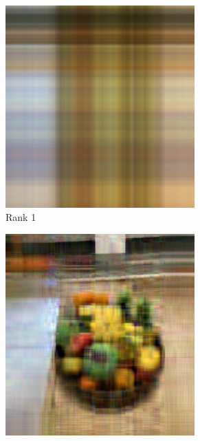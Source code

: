 \documentclass[12pt]{article}
\theoremstyle{definition}
\begin{document}
\begin{figure}[ht]
     \centering
     \begin{subfigure}[b]{0.45\textwidth}
         \centering
         \includegraphics[width=0.8\textwidth]{ch2_figures/result_compression_fruit_1.png}
         \caption{Rank 1}
         \label{fig:compression_1}
     \end{subfigure}
     \hfill
     \begin{subfigure}[b]{0.45\textwidth}
         \centering
         \includegraphics[width=0.8\textwidth]{ch2_figures/result_compression_fruit_10.png}

\end{subfigure}
\end{figure}
\end{document}
